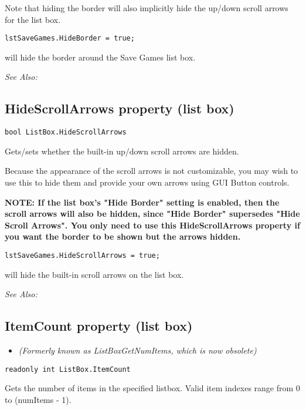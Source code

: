 Note that hiding the border will also implicitly hide the up/down scroll arrows for the list box.

\begin{verbatim}
lstSaveGames.HideBorder = true;
\end{verbatim}
will hide the border around the Save Games list box.

\it{See Also:} 


\subsection{HideScrollArrows property (list box)}\label{ListBox.HideScrollArrows}%

\begin{verbatim}
bool ListBox.HideScrollArrows
\end{verbatim}
Gets/sets whether the built-in up/down scroll arrows are hidden.

Because the appearance of the scroll arrows is not customizable, you may wish to use
this to hide them and provide your own arrows using GUI Button controls.

\bf{NOTE:} If the list box's "Hide Border" setting is enabled, then the scroll arrows will
also be hidden, since "Hide Border" supersedes "Hide Scroll Arrows". You only need to
use this HideScrollArrows property if you want the border to be shown but the arrows hidden.

\begin{verbatim}
lstSaveGames.HideScrollArrows = true;
\end{verbatim}
will hide the built-in scroll arrows on the list box.

\it{See Also:} 


\subsection{ItemCount property (list box)}\label{ListBox.ItemCount}%

\begin{itemize}
\item \it{(Formerly known as ListBoxGetNumItems, which is now obsolete)}
\end{itemize}

\begin{verbatim}
readonly int ListBox.ItemCount
\end{verbatim}
Gets the number of items in the specified listbox. Valid item indexes
range from 0 to (numItems - 1).


